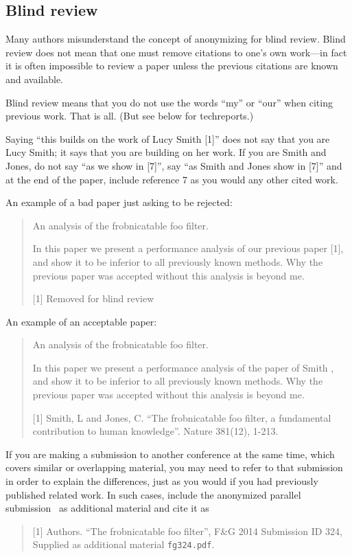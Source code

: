 \documentclass[10pt,twocolumn,letterpaper]{article}
\begin{document}
\subsection{Blind review}

Many authors misunderstand the concept of anonymizing for blind
review.  Blind review does not mean that one must remove
citations to one's own work---in fact it is often impossible to
review a paper unless the previous citations are known and
available.

Blind review means that you do not use the words ``my'' or ``our''
when citing previous work.  That is all.  (But see below for
techreports.)

Saying ``this builds on the work of Lucy Smith [1]'' does not say
that you are Lucy Smith; it says that you are building on her
work.  If you are Smith and Jones, do not say ``as we show in
[7]'', say ``as Smith and Jones show in [7]'' and at the end of the
paper, include reference 7 as you would any other cited work.

An example of a bad paper just asking to be rejected:
\begin{quote}
\begin{center}
    An analysis of the frobnicatable foo filter.
\end{center}

   In this paper we present a performance analysis of our
   previous paper [1], and show it to be inferior to all
   previously known methods.  Why the previous paper was
   accepted without this analysis is beyond me.

   [1] Removed for blind review
\end{quote}


An example of an acceptable paper:

\begin{quote}
\begin{center}
     An analysis of the frobnicatable foo filter.
\end{center}

   In this paper we present a performance analysis of the
   paper of Smith \etal [1], and show it to be inferior to
   all previously known methods.  Why the previous paper
   was accepted without this analysis is beyond me.

   [1] Smith, L and Jones, C. ``The frobnicatable foo
   filter, a fundamental contribution to human knowledge''.
   Nature 381(12), 1-213.
\end{quote}

If you are making a submission to another conference at the same time,
which covers similar or overlapping material, you may need to refer to that
submission in order to explain the differences, just as you would if you
had previously published related work.  In such cases, include the
anonymized parallel submission~\cite{Authors14} as additional material and
cite it as
\begin{quote}
[1] Authors. ``The frobnicatable foo filter'', F\&G 2014 Submission ID 324,
Supplied as additional material {\tt fg324.pdf}.
\end{quote}
\end{document}
